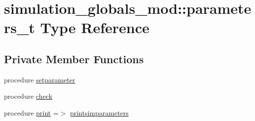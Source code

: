 \hypertarget{structsimulation__globals__mod_1_1parameters__t}{}\section{simulation\+\_\+globals\+\_\+mod\+:\+:parameters\+\_\+t Type Reference}
\label{structsimulation__globals__mod_1_1parameters__t}
\subsection*{Private Member Functions}
\begin{DoxyCompactItemize}
\item 
procedure \hyperlink{structsimulation__globals__mod_1_1parameters__t_ab4df8a29214aa31b554483bb8c07004c}{setparameter}
\item 
procedure \hyperlink{structsimulation__globals__mod_1_1parameters__t_ab0dc483d1a0d000e43726c19c892a65d}{check}
\item 
procedure \hyperlink{structsimulation__globals__mod_1_1parameters__t_a220b7b25f77a4e33694055d5427a30dd}{print} =$>$ \hyperlink{namespacesimulation__globals__mod_a97c04d0289a9f2d004a9329cb7ab16f0}{printsimparameters}
\end{DoxyCompactItemize}
